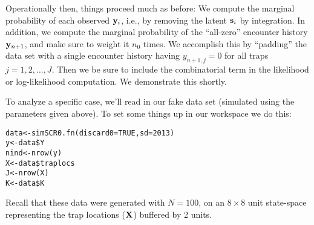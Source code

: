 Operationally then, things proceed much as before: 
We compute the marginal probability of each observed ${\bf y}_{i}$,
i.e., by removing the latent ${\bf s}_{i}$ by integration. In
addition, we 
 compute the marginal probability of the ``all-zero'' encounter
history ${\bf y}_{n+1}$, and make sure to weight it $n_{0}$ times. We
accomplish this by ``padding'' the data set with a single encounter
history having $y_{n+1,j}=0$ for all traps $j=1,2,\ldots,J$. Then we
be sure to include the combinatorial term in the likelihood or
log-likelihood computation. We demonstrate this shortly.

To analyze a specific case, we’ll read in our fake data set (simulated
using the parameters given above). To set some things up in our
workspace we do this:
\begin{verbatim}
data<-simSCR0.fn(discard0=TRUE,sd=2013)
y<-data$Y
nind<-nrow(y)
X<-data$traplocs
J<-nrow(X)
K<-data$K
\end{verbatim}
Recall that these data were generated with $N=100$, on an $8 \times 8$ unit
state-space representing the trap locations (${\bf X}$) buffered by 2 units.

